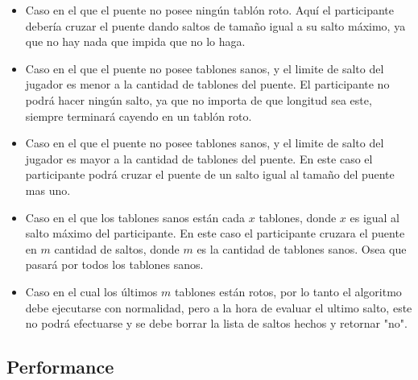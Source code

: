 \begin{itemize}

\item Caso en el que el puente no posee ningún tablón roto. Aquí el participante debería cruzar el puente dando saltos de tamaño igual a su salto máximo, ya que no hay nada que impida que no lo haga.

\item Caso en el que el puente no posee tablones sanos, y el limite de salto del jugador es menor a la cantidad de tablones del puente. El participante no podrá hacer ningún salto, ya que no importa de que longitud sea este, siempre terminará cayendo en un tablón roto.

\item Caso en el que el puente no posee tablones sanos, y el limite de salto del jugador es mayor a la cantidad de tablones del puente. En este caso el participante podrá cruzar el puente de un salto igual al tamaño del puente mas uno.

\item Caso en el que los tablones sanos están cada $x$ tablones, donde $x$ es igual al salto máximo del participante. En este caso el participante cruzara el puente en $m$ cantidad de saltos, donde $m$ es la cantidad de tablones sanos. Osea que pasará por todos los tablones sanos.

\item Caso en el cual los últimos $m$ tablones están rotos, por lo tanto el algoritmo debe ejecutarse con normalidad, pero a la hora de evaluar el ultimo salto, este no podrá efectuarse y se debe borrar la lista de saltos hechos y retornar "no".

\end{itemize}


\subsection{Performance}
